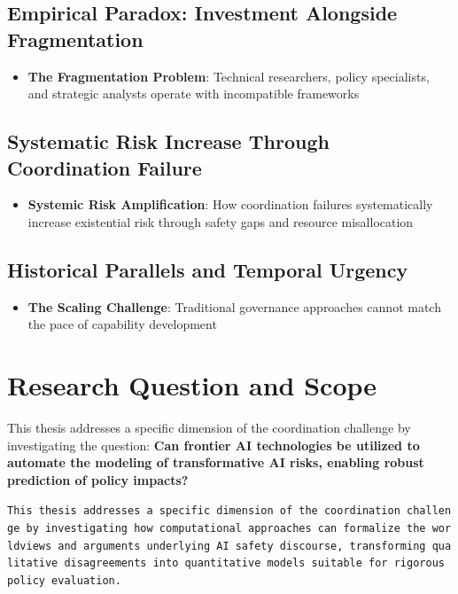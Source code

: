 \documentclass[12pt,a4paper]{report}
\providecommand{\tightlist}{%
  \setlength{\itemsep}{0pt}\setlength{\parskip}{0pt}}
\begin{document}
\subsection{Empirical Paradox: Investment Alongside
Fragmentation}\label{sec-empirical-paradox}

\begin{itemize}
\tightlist
\item
  \textbf{The Fragmentation Problem}: Technical researchers, policy
  specialists, and strategic analysts operate with incompatible
  frameworks
\end{itemize}

\subsection{Systematic Risk Increase Through Coordination
Failure}\label{sec-risk-increase}

\begin{itemize}
\tightlist
\item
  \textbf{Systemic Risk Amplification}: How coordination failures
  systematically increase existential risk through safety gaps and
  resource misallocation
\end{itemize}

\subsection{Historical Parallels and Temporal
Urgency}\label{sec-historical-parallels}

\begin{itemize}
\tightlist
\item
  \textbf{The Scaling Challenge}: Traditional governance approaches
  cannot match the pace of capability development
\end{itemize}

\section{Research Question and Scope}\label{sec-research-question}

This thesis addresses a specific dimension of the coordination challenge
by investigating the question: \textbf{Can frontier AI technologies be
utilized to automate the modeling of transformative AI risks, enabling
robust prediction of policy impacts?}

\texttt{This\ thesis\ addresses\ a\ specific\ dimension\ of\ the\ coordination\ challenge\ by\ investigating\ how\ computational\ approaches\ can\ formalize\ the\ worldviews\ and\ arguments\ underlying\ AI\ safety\ discourse,\ transforming\ qualitative\ disagreements\ into\ quantitative\ models\ suitable\ for\ rigorous\ policy\ evaluation.}
\end{document}
